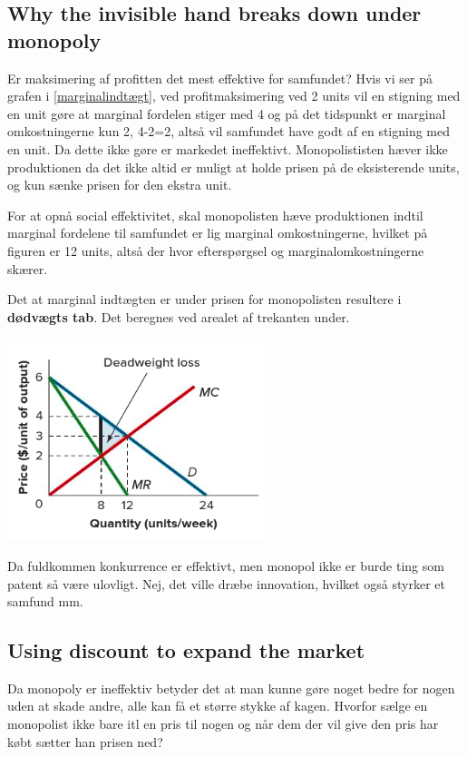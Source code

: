 \subsection{Why the invisible hand breaks down under monopoly}
Er maksimering af profitten det mest effektive for samfundet? Hvis vi ser på grafen i \autoref{marginalindtægt}, ved profitmaksimering ved 2 units vil en stigning med en unit gøre at marginal fordelen stiger med 4 og på det tidspunkt er marginal omkostningerne kun 2, 4-2=2, altså vil samfundet have godt af en stigning med en unit. Da dette ikke gøre er markedet ineffektivt. Monopolististen hæver ikke produktionen da det ikke altid er muligt at holde prisen på de eksisterende units, og kun sænke prisen for den ekstra unit. 

For at opnå social effektivitet, skal monopolisten hæve produktionen indtil marginal fordelene til samfundet er lig marginal omkostningerne, hvilket på figuren er 12 units, altså der hvor efterspørgsel og marginalomkostningerne skærer. 

Det at marginal indtægten er under prisen for monopolisten resultere i \textbf{dødvægts tab}. Det beregnes ved arealet af trekanten under. 

\includegraphics[scale=0.7]{Afsnit/Lektion4/trekantensareal.png}

Da fuldkommen konkurrence er effektivt, men monopol ikke er burde ting som patent så være ulovligt. Nej, det ville dræbe innovation, hvilket også styrker et samfund mm. 

\subsection{Using discount to expand the market}
Da monopoly er ineffektiv betyder det at man kunne gøre noget bedre for nogen uden at skade andre, alle kan få et større stykke af kagen. Hvorfor sælge en monopolist ikke bare itl en pris til nogen og når dem der vil give den pris har købt sætter han prisen ned?

